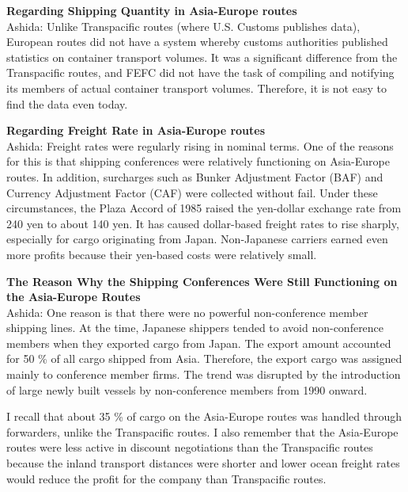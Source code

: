 \documentclass[11pt]{article}
\begin{document}
\textbf{Regarding Shipping Quantity in Asia-Europe routes} \\
Ashida: Unlike Transpacific routes (where U.S. Customs publishes data), European routes did not have a system whereby customs authorities published statistics on container transport volumes. It was a significant difference from the Transpacific routes, and FEFC did not have the task of compiling and notifying its members of actual container transport volumes. Therefore, it is not easy to find the data even today. %

\textbf{Regarding Freight Rate in Asia-Europe routes} \\
Ashida: Freight rates were regularly rising in nominal terms. One of the reasons for this is that shipping conferences were relatively functioning on Asia-Europe routes. In addition, surcharges such as Bunker Adjustment Factor (BAF) and Currency Adjustment Factor (CAF) were collected without fail. Under these circumstances, the Plaza Accord of 1985 raised the yen-dollar exchange rate from 240 yen to about 140 yen. It has caused dollar-based freight rates to rise sharply, especially for cargo originating from Japan. Non-Japanese carriers earned even more profits because their yen-based costs were relatively small.  %

\textbf{The Reason Why the Shipping Conferences Were Still Functioning on the Asia-Europe Routes}\\
Ashida: One reason is that there were no powerful non-conference member shipping lines. At the time, Japanese shippers tended to avoid non-conference members when they exported cargo from Japan. The export amount accounted for 50 \% of all cargo shipped from Asia. Therefore, the export cargo was assigned mainly to conference member firms. The trend was disrupted by the introduction of large newly built vessels by non-conference members from 1990 onward.

I recall that about 35 \% of cargo on the Asia-Europe routes was handled through forwarders, unlike the Transpacific routes. I also remember that the Asia-Europe routes were less active in discount negotiations than the Transpacific routes because the inland transport distances were shorter and lower ocean freight rates would reduce the profit for the company than Transpacific routes. %
\end{document}
